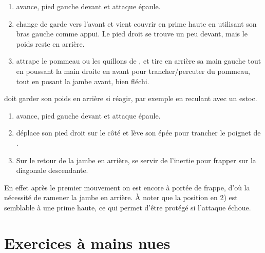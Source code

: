 \begin{technique}
	\label{att:tech:changement-garde-2-temps-prime-haute}

	\begin{enumerate}
		\item \D avance, pied gauche devant et \A attaque épaule.
		
		\item \D change de garde vers l'avant et vient couvrir en prime haute en utilisant son bras gauche comme appui.
		Le pied droit se trouve un peu devant, mais le poids reste en arrière.
		
		\item \D attrape le pommeau ou les quillons de \A, et tire en arrière sa main gauche tout en poussant la main droite en avant pour trancher/percuter du pommeau, tout en posant la jambe avant, bien fléchi.
	\end{enumerate}

	\D doit garder son poids en arrière si \A réagir, par exemple en reculant avec un estoc.

\end{technique}


\begin{technique}
	\label{att:tech:changement-garde-2-temps-latéral-prime}

	\begin{enumerate}
		\item \D avance, pied gauche devant et \A attaque épaule.
		
		\item \D déplace son pied droit sur le côté et lève son épée pour trancher le poignet de \A.
		
		\item Sur le retour de la jambe en arrière, se servir de l'inertie pour frapper sur la diagonale descendante.
	\end{enumerate}

	En effet après le premier mouvement on est encore à portée de frappe, d'où la nécessité de ramener la jambe en arrière.
	À noter que la position en 2) est semblable à une prime haute, ce qui permet d'être protégé si l'attaque échoue.
\end{technique}


\section{Exercices à mains nues}


